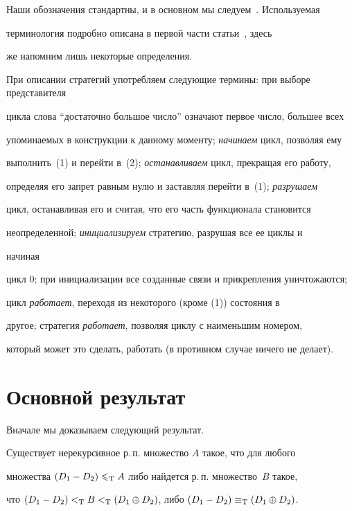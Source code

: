 Наши обозначения стандартны, и в основном мы следуем~\cite{So}. Используемая


терминология подробно описана в первой части статьи~\cite{Efr}, здесь


же напомним лишь некоторые определения.





При описании стратегий употребляем следующие термины: при выборе представителя


цикла слова ``достаточно большое число'' означают первое число, большее всех


упоминаемых в конструкции к данному моменту; {\it начинаем} цикл, позволяя ему


выполнить~(1) и перейти в~(2); {\it останавливаем} цикл, прекращая его работу,


определяя его запрет равным нулю и заставляя перейти в~(1); {\it разрушаем}


цикл, останавливая его и считая, что его часть функционала становится 


неопределенной; {\it инициализируем} стратегию, разрушая все ее циклы и


начиная


цикл 0; при инициализации все созданные связи и прикрепления уничтожаются;


цикл {\it работает}, переходя из некоторого (кроме (1)) состояния в


другое; стратегия {\it работает}, позволяя циклу с наименьшим номером, 


который может это сделать, работать (в противном случае ничего не делает).








\section{Основной результат}





Вначале мы доказываем следующий результат.


\begin{thmnonum}\label{DEN}


Существует нерекурсивное р.\,п. множество $A$ такое, что для любого \re{}


множества $\draz\mer_{\mathrm T}A$ либо найдется р.\,п. множество~$B$ такое,


что $\draz<_{\mathrm T}B<_{\mathrm T}\dsum$, либо $\draz\equiv_{\mathrm T}


\dsum$. 


\end{thmnonum}






